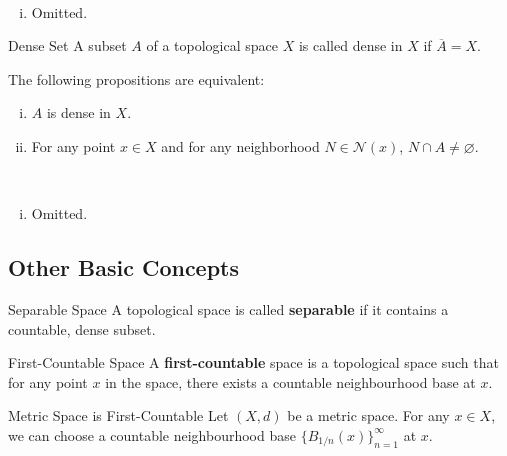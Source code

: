 \documentclass{report}
\begin{document}
\begin{prf}~\\ \vspace{-1em}
	\begin{enumerate}[(i)]
		\item Omitted.
	\end{enumerate}
\end{prf}


\begin{definition}{Dense Set}{}
	A subset $A$ of a topological space $X$ is called dense in $X$ if  $\overline{A}=X$.
\end{definition}

\begin{proposition}{}{}
	The following propositions are equivalent:
	\begin{enumerate}[(i)]
		\item $A$ is dense in $X$.
		\item For any point $x \in X$ and for any neighborhood $N\in\mathcal{N}(x)$, $N\cap A\ne \varnothing$.
	\end{enumerate}
\end{proposition}

\begin{prf}~\\ \vspace{-1em}
	\begin{enumerate}[(i)]
		\item Omitted.
	\end{enumerate}
\end{prf}


\subsection{Other Basic Concepts}

\begin{definition}{Separable Space}{}
	A topological space is called \textbf{separable} if it contains a countable, dense subset.
\end{definition}


\begin{definition}{First-Countable Space}{}
	A \textbf{first-countable} space is a topological space such that for any point $x$ in the space, there exists a countable neighbourhood base at $x$.
\end{definition}

\begin{example}{Metric Space is First-Countable}{}
	Let $(X,d)$ be a metric space. For any $x\in X$, we can choose a countable neighbourhood base $\{B_{1/n}(x)\}_{n=1}^\infty$ at $x$.
\end{example}
\end{document}
